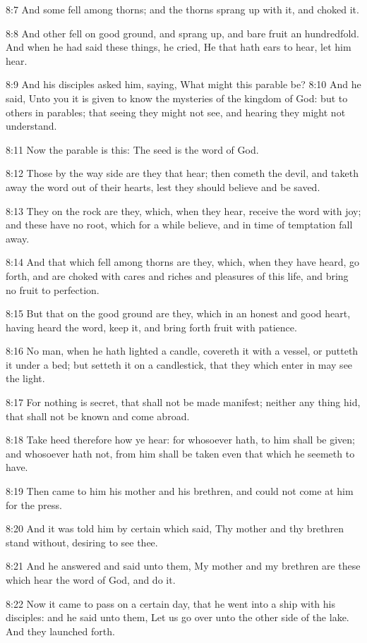 8:7 And some fell among thorns; and the thorns sprang up with it, and
choked it.

8:8 And other fell on good ground, and sprang up, and bare fruit an
hundredfold. And when he had said these things, he cried, He that hath
ears to hear, let him hear.

8:9 And his disciples asked him, saying, What might this parable be?
8:10 And he said, Unto you it is given to know the mysteries of the
kingdom of God: but to others in parables; that seeing they might not
see, and hearing they might not understand.

8:11 Now the parable is this: The seed is the word of God.

8:12 Those by the way side are they that hear; then cometh the devil,
and taketh away the word out of their hearts, lest they should believe
and be saved.

8:13 They on the rock are they, which, when they hear, receive the
word with joy; and these have no root, which for a while believe, and
in time of temptation fall away.

8:14 And that which fell among thorns are they, which, when they have
heard, go forth, and are choked with cares and riches and pleasures of
this life, and bring no fruit to perfection.

8:15 But that on the good ground are they, which in an honest and good
heart, having heard the word, keep it, and bring forth fruit with
patience.

8:16 No man, when he hath lighted a candle, covereth it with a vessel,
or putteth it under a bed; but setteth it on a candlestick, that they
which enter in may see the light.

8:17 For nothing is secret, that shall not be made manifest; neither
any thing hid, that shall not be known and come abroad.

8:18 Take heed therefore how ye hear: for whosoever hath, to him shall
be given; and whosoever hath not, from him shall be taken even that
which he seemeth to have.

8:19 Then came to him his mother and his brethren, and could not come
at him for the press.

8:20 And it was told him by certain which said, Thy mother and thy
brethren stand without, desiring to see thee.

8:21 And he answered and said unto them, My mother and my brethren are
these which hear the word of God, and do it.

8:22 Now it came to pass on a certain day, that he went into a ship
with his disciples: and he said unto them, Let us go over unto the
other side of the lake. And they launched forth.

